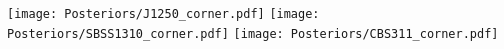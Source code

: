 \documentclass[fleqn,usenatbib,useAMS]{mnras}
\begin{document}
\begin{figure*}
	\texttt{[image: Posteriors/J1250\_corner.pdf]}
	\texttt{[image: Posteriors/SBSS1310\_corner.pdf]}
 	\texttt{[image: Posteriors/CBS311\_corner.pdf]}
 	\contcaption{}
\end{figure*}



\bsp	%
\label{lastpage}
\end{document}
